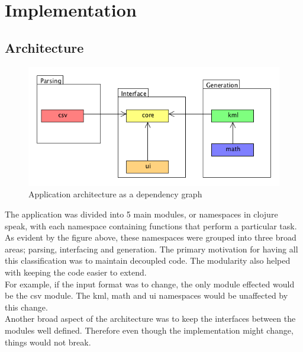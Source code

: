 
\chapter{Implementation}

\label{ch:implementation}

\section{Architecture}

\begin{figure}[h]
\centering
  \includegraphics[scale=0.5]{gfx/fyp-arch.png}
\caption{Application architecture as a dependency graph}
\end{figure}

The application was divided into 5 main modules, or namespaces in clojure speak, with each namespace containing functions that perform a particular task. \\

As evident by the figure above, these namespaces were grouped into three broad areas; parsing, interfacing and generation. The primary motivation for having all this classification was to maintain decoupled code. The modularity also helped with keeping the code easier to extend. \\

For example, if the input format was to change, the only module effected would be the csv module. The kml, math and ui namespaces would be unaffected by this change. \\

Another broad aspect of the architecture was to keep the interfaces between the modules well defined. Therefore even though the implementation might change, things would not break.\\

